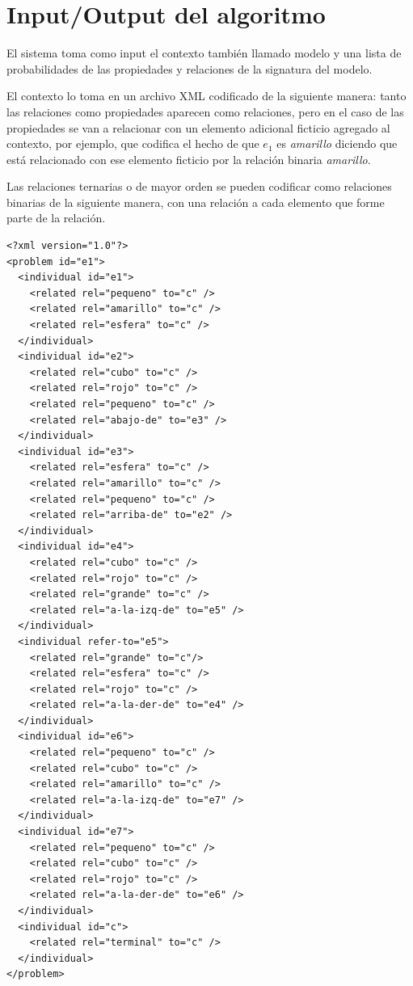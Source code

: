 \section{Input/Output del algoritmo}
\label{input_algo}
El sistema toma como input el contexto tambi\'en llamado modelo y una lista de probabilidades de las propiedades y relaciones de la signatura del modelo.

El contexto lo toma en un archivo XML codificado de la siguiente manera: tanto las relaciones como propiedades aparecen como relaciones, pero en el caso de las propiedades se van a relacionar con un elemento adicional ficticio agregado al contexto, por ejemplo, que codifica el hecho de que $e_1$ es \emph{amarillo} diciendo que est\'a relacionado con ese elemento ficticio por la relaci\'on binaria \emph{amarillo}. 

Las relaciones ternarias o de mayor orden se pueden codificar como relaciones binarias de la siguiente manera, con una relaci\'on a cada elemento que forme parte de la relaci\'on. 


\begin{verbatim}
<?xml version="1.0"?>
<problem id="e1">
  <individual id="e1">
    <related rel="pequeno" to="c" />
    <related rel="amarillo" to="c" />
    <related rel="esfera" to="c" />
  </individual>
  <individual id="e2">
    <related rel="cubo" to="c" />
    <related rel="rojo" to="c" />
    <related rel="pequeno" to="c" />
    <related rel="abajo-de" to="e3" />
  </individual>
  <individual id="e3">
    <related rel="esfera" to="c" />
    <related rel="amarillo" to="c" />
    <related rel="pequeno" to="c" />
    <related rel="arriba-de" to="e2" />
  </individual>
  <individual id="e4">
    <related rel="cubo" to="c" />
    <related rel="rojo" to="c" />
    <related rel="grande" to="c" />
    <related rel="a-la-izq-de" to="e5" />
  </individual>
  <individual refer-to="e5">
    <related rel="grande" to="c"/>
    <related rel="esfera" to="c" />
    <related rel="rojo" to="c" />
    <related rel="a-la-der-de" to="e4" />
  </individual>
  <individual id="e6">
    <related rel="pequeno" to="c" />
    <related rel="cubo" to="c" />
    <related rel="amarillo" to="c" />
    <related rel="a-la-izq-de" to="e7" />
  </individual>
  <individual id="e7">
    <related rel="pequeno" to="c" />
    <related rel="cubo" to="c" />
    <related rel="rojo" to="c" />
    <related rel="a-la-der-de" to="e6" />
  </individual>
  <individual id="c">
    <related rel="terminal" to="c" />
  </individual> 
</problem>
\end{verbatim}

